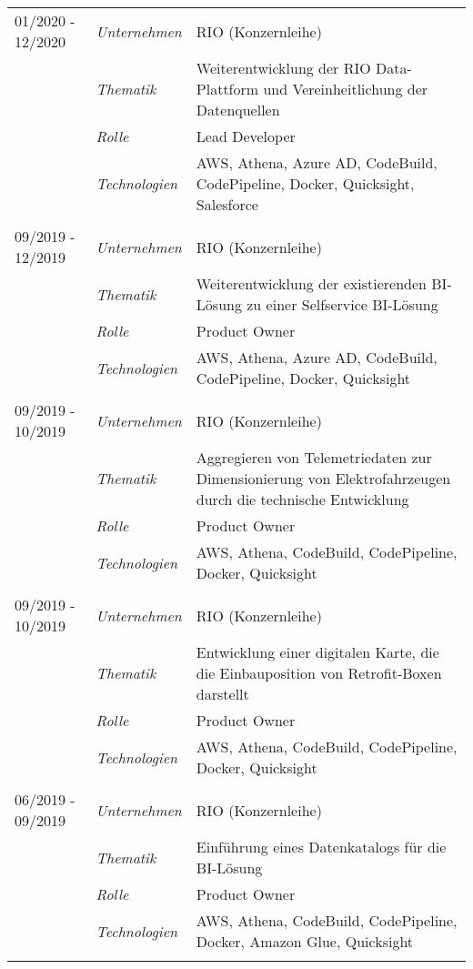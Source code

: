 \begin{longtable}{@{}>{}p{4cm}>{\itshape}p{2cm}>{}p{9cm}}
\\
01/2020 - 12/2020 & Unternehmen   & RIO (Konzernleihe)\\
\nopagebreak		& Thematik	    & Weiterentwicklung der RIO Data-Plattform und Vereinheitlichung der Datenquellen\\
\nopagebreak		& Rolle 	      & Lead Developer\\
\nopagebreak		& Technologien	& AWS, Athena, Azure AD, CodeBuild, CodePipeline, Docker, Quicksight, Salesforce\\
\\
09/2019 - 12/2019 & Unternehmen   & RIO (Konzernleihe)\\
\nopagebreak		& Thematik	    & Weiterentwicklung der existierenden BI-Lösung zu einer Selfservice BI-Lösung\\
\nopagebreak		& Rolle 	      & Product Owner\\
\nopagebreak		& Technologien	& AWS, Athena, Azure AD, CodeBuild, CodePipeline, Docker, Quicksight\\
\\
09/2019 - 10/2019 & Unternehmen   & RIO (Konzernleihe)\\
\nopagebreak		& Thematik	    & Aggregieren von  Telemetriedaten zur Dimensionierung von Elektrofahrzeugen durch die technische Entwicklung\\
\nopagebreak		& Rolle 	      & Product Owner\\
\nopagebreak		& Technologien	& AWS, Athena, CodeBuild, CodePipeline, Docker, Quicksight\\
\\
09/2019 - 10/2019 & Unternehmen   & RIO (Konzernleihe)\\
\nopagebreak		& Thematik	    & Entwicklung einer digitalen Karte, die die Einbauposition von Retrofit-Boxen darstellt\\
\nopagebreak		& Rolle 	      & Product Owner\\
\nopagebreak		& Technologien	& AWS, Athena, CodeBuild, CodePipeline, Docker, Quicksight\\
\\
06/2019 - 09/2019 & Unternehmen   & RIO (Konzernleihe)\\
\nopagebreak		& Thematik	    & Einführung eines Datenkatalogs für die BI-Lösung\\
\nopagebreak		& Rolle 	      & Product Owner\\
\nopagebreak		& Technologien	& AWS, Athena, CodeBuild, CodePipeline, Docker, Amazon Glue, Quicksight\\
\\

\end{longtable}
